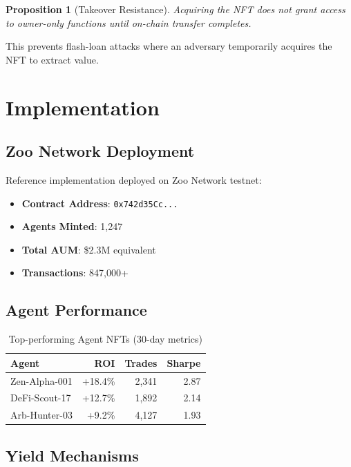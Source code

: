 \documentclass[11pt,letterpaper]{article}
\newtheorem{proposition}[theorem]{Proposition}
\begin{document}
\begin{proposition}[Takeover Resistance]
Acquiring the NFT does not grant access to owner-only functions until on-chain transfer completes.
\end{proposition}

This prevents flash-loan attacks where an adversary temporarily acquires the NFT to extract value.

\section{Implementation}
\label{sec:implementation}

\subsection{Zoo Network Deployment}

Reference implementation deployed on Zoo Network testnet:

\begin{itemize}
    \item \textbf{Contract Address}: \texttt{0x742d35Cc...}
    \item \textbf{Agents Minted}: 1,247
    \item \textbf{Total AUM}: \$2.3M equivalent
    \item \textbf{Transactions}: 847,000+
\end{itemize}

\subsection{Agent Performance}

\begin{table}[h]
\centering
\caption{Top-performing Agent NFTs (30-day metrics)}
\label{tab:performance}
\begin{tabular}{lrrr}
\toprule
\textbf{Agent} & \textbf{ROI} & \textbf{Trades} & \textbf{Sharpe} \\
\midrule
Zen-Alpha-001 & +18.4\% & 2,341 & 2.87 \\
DeFi-Scout-17 & +12.7\% & 1,892 & 2.14 \\
Arb-Hunter-03 & +9.2\% & 4,127 & 1.93 \\
\bottomrule
\end{tabular}
\end{table}

\subsection{Yield Mechanisms}
\end{document}

